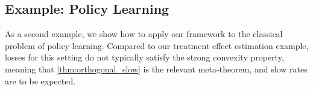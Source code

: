 \documentclass[11pt]{article} %
\newcommand{\pref}[1]{\cref{#1}}
\theoremstyle{theorem}  %
\theoremstyle{plain}
\newcommand{\nuisance}{\cG}
\newcommand{\Rate}{\mathrm{Rate}_{\cD}}
\let\oldparagraph\paragraph
\renewcommand{\paragraph}[1]{\oldparagraph{#1.}}
\let\oldparagraph\paragraph
\renewcommand{\paragraph}[1]{\oldparagraph*{#1}}
\begin{document}

%
%
%
%
 
\subsection{Example: Policy Learning}
\label{sec:policy_learning_body}
%
As a second example, we show how to apply our framework to the classical problem of policy learning. Compared to our treatment effect estimation example, losses for this setting do not typically satisfy the strong convexity property, meaning that \pref{thm:orthogonal_slow} is the relevant meta-theorem, and slow rates are to be expected.
\end{document}
